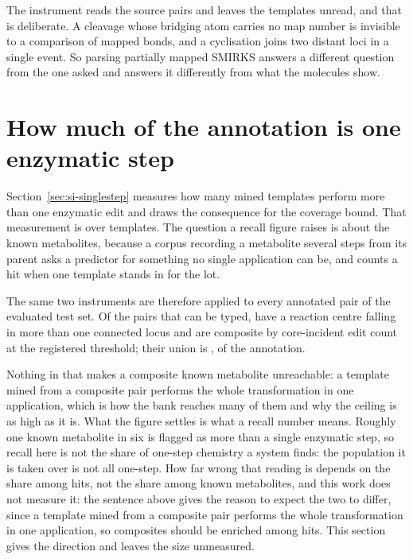 \documentclass[journal=jcisd8,manuscript=suppinfo,layout=onecolumn]{achemso}
\begin{document}
The instrument reads the source pairs and leaves the templates unread, and that is deliberate. A
cleavage whose bridging atom carries no map number is invisible to a comparison of mapped bonds, and
a cyclisation joins two distant loci in a single event. So parsing partially mapped SMIRKS answers a
different question from the one asked and answers it differently from what the molecules show.

\section{How much of the annotation is one enzymatic step}
\label{sec:si-refstep}

Section~\ref{sec:si-singlestep} measures how many mined templates perform more than one enzymatic
edit and draws the consequence for the coverage bound. That measurement is over templates. The
question a recall figure raises is about the known metabolites, because a corpus recording a
metabolite several steps from its parent asks a predictor for something no single application can
be, and counts a hit when one template stands in for the lot.

The same two instruments are therefore applied to every annotated pair of the evaluated test set.
Of the \numRefstepTyped{} pairs that can be typed, \numRefstepLoci{} have a reaction centre falling
in more than one connected locus and \numRefstepEdits{} are composite by core-incident edit count
at the registered threshold; their union is \numRefstepEither{},
\numRefstepEithersharePct{} of the annotation.

Nothing in that makes a composite known metabolite unreachable: a template mined from a composite pair
performs the whole transformation in one application, which is how the bank reaches many of them
and why the ceiling is as high as it is. What the figure settles
is what a recall number means. Roughly one known metabolite in six is flagged as more than a
single enzymatic step, so recall here is not the share of one-step chemistry a system finds: the
population it is taken
over is not all one-step. How far wrong that reading is
depends on the share among hits, not the share among known metabolites, and this work does not measure it:
the
sentence above gives the reason to expect the two to differ, since a template mined from a composite
pair performs the whole transformation in one application, so composites should be enriched among
hits. This section gives the direction and leaves the size unmeasured.
\end{document}
